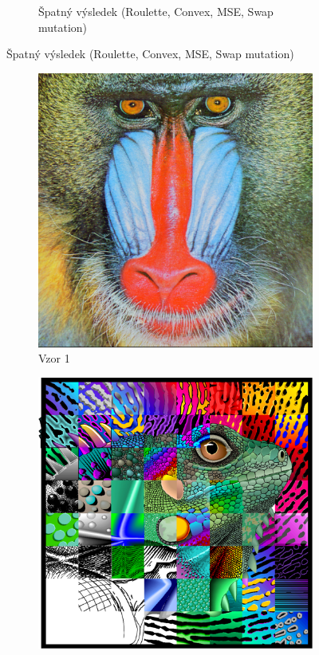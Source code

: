 \documentclass[a4paper,11pt]{scrartcl}
\begin{document}
\begin{figure}[!h]
\begin{subfigure}[b]{0.32\textwidth}
        \caption{Špatný výsledek (Roulette, Convex, MSE, Swap mutation)}
        \label{fig:ex33}
    \end{subfigure}
\end{figure}

\begin{figure}[!h]
    \centering
    \caption{Vzory}
    \label{vzory}
    \begin{subfigure}[b]{0.4\textwidth}
        \includegraphics[width=\textwidth]{img/example1.png}
        \caption{Vzor 1}
        \label{fig:gull}
    \end{subfigure}
    \begin{subfigure}[b]{0.4\textwidth}
        \includegraphics[width=\textwidth]{img/example2.png}

\end{subfigure}
\end{figure}
\end{document}
